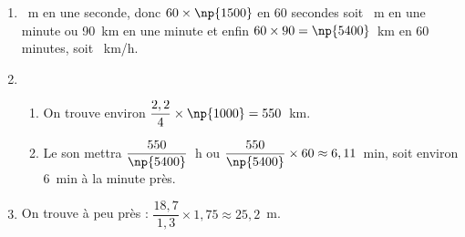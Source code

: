 
\medskip

\begin{enumerate}
\item {}~m en une seconde, donc $60 \times \np{1500}$ en 60 secondes soit ~m en une minute ou 90~km en une minute et enfin $60 \times 90 = \np{5400}$~km en 60 minutes, soit ~km/h.
\item
	\begin{enumerate}
		\item On trouve environ $\dfrac{2,2}{4} \times \np{1000} = 550$~km.
		\item Le son mettra $\dfrac{550}{\np{5400}}$~h ou $\dfrac{550}{\np{5400}} \times 60 \approx 6,11$~min, soit environ 6~min à la minute près.
	\end{enumerate}
\item On trouve à peu près : $\dfrac{18,7}{1,3} \times 1,75 \approx 25,2$~m.
\end{enumerate}

\bigskip

